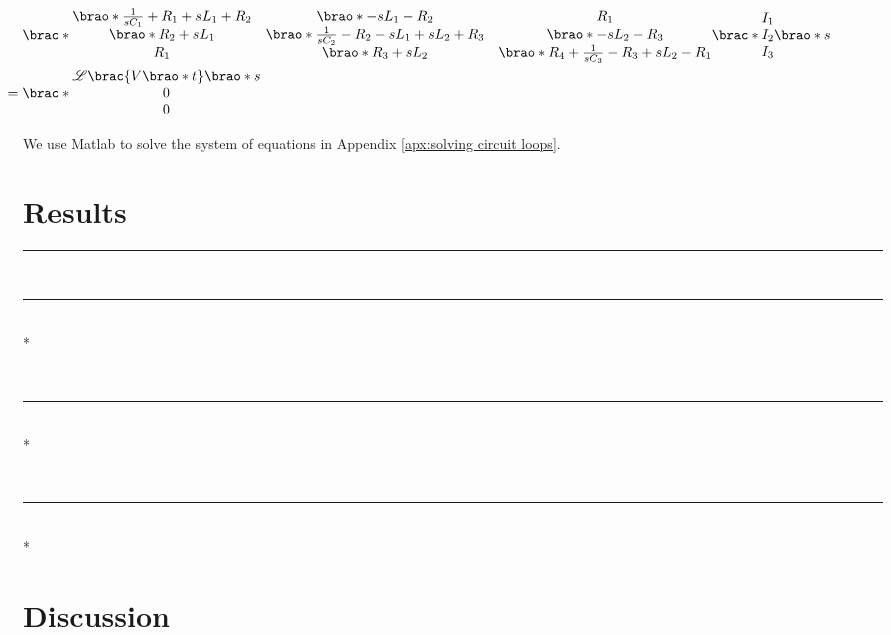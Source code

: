\documentclass[12pt]{article}
\DeclarePairedDelimiter\brao()%
\DeclarePairedDelimiter\brac[]%
\newlength\oldparskip
\newlength\newparskip
\newcommand*\setparskip{\setlength\parskip\newparskip}
\newcommand*\resetparskip{\setlength\parskip\oldparskip}
\def\hr{{\par\noindent\rule{\textwidth}{0.4pt}}}
\begin{document}
\begin{equation}
    \hskip-5em
    \begin{aligned}
        &\brac*{
            \begin{matrix}
                \brao*{\frac1{sC_1} + R_1 + sL_1 + R_2} & \brao*{-sL_1 - R_2} & R_1
            \\*
                \brao*{R_2 + sL_1} & \brao*{\frac1{sC_2} - R_2 - sL_1 + sL_2 + R_3} & \brao*{-sL_2 - R_3}
            \\*
                R_1 & \brao*{R_3 + sL_2} & \brao*{R_4 + \frac1{sC_3} - R_3 + sL_2 - R_1}
            \\*
            \end{matrix}
        }\brac*{
            \begin{matrix}
                I_1 \\* I_2 \\* I_3 \\*
            \end{matrix}        
        }%
        \brao*s
    \\*
        ={}&
        \brac*{
            \begin{matrix}
                \mathscr{L}\brac{V\brao*t}\brao*s \\* 0 \\* 0 \\*
            \end{matrix}
        }
    \end{aligned}
\end{equation}

We use Matlab to solve the system of equations in Appendix \ref{apx:solving circuit loops}.

\section{Results}

\hr
\resetparskip

\setparskip

\ \hr \\*
\resetparskip

\setparskip

\ \hr \\*
\resetparskip

\setparskip

\ \hr \\*

\section{Discussion}
\end{document}
